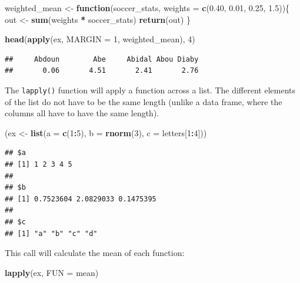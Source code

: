 \documentclass[]{book}
\makeatletter
\newenvironment{Shaded}{\begin{snugshade}}{\end{snugshade}}
\newcommand{\KeywordTok}[1]{\textcolor[rgb]{0.13,0.29,0.53}{\textbf{#1}}}
\newcommand{\DataTypeTok}[1]{\textcolor[rgb]{0.13,0.29,0.53}{#1}}
\newcommand{\DecValTok}[1]{\textcolor[rgb]{0.00,0.00,0.81}{#1}}
\newcommand{\FloatTok}[1]{\textcolor[rgb]{0.00,0.00,0.81}{#1}}
\newcommand{\StringTok}[1]{\textcolor[rgb]{0.31,0.60,0.02}{#1}}
\newcommand{\ControlFlowTok}[1]{\textcolor[rgb]{0.13,0.29,0.53}{\textbf{#1}}}
\newcommand{\OperatorTok}[1]{\textcolor[rgb]{0.81,0.36,0.00}{\textbf{#1}}}
\newcommand{\NormalTok}[1]{#1}
\newenvironment{kframe}{%
\medskip{}
\setlength{\fboxsep}{.8em}
 \def\at@end@of@kframe{}%
 \ifinner\ifhmode%
  \def\at@end@of@kframe{\end{minipage}}%
  \begin{minipage}{\columnwidth}%
 \fi\fi%
 \def\FrameCommand##1{\hskip\@totalleftmargin \hskip-\fboxsep
 \colorbox{shadecolor}{##1}\hskip-\fboxsep
     \hskip-\linewidth \hskip-\@totalleftmargin \hskip\columnwidth}%
 \MakeFramed {\advance\hsize-\width
   \@totalleftmargin\z@ \linewidth\hsize
   \@setminipage}}%
 {\par\unskip\endMakeFramed%
 \at@end@of@kframe}
\renewenvironment{Shaded}{\begin{kframe}}{\end{kframe}}
\theoremstyle{definition}
\theoremstyle{definition}
\theoremstyle{definition}
\theoremstyle{remark}
\makeatother
\begin{document}
\begin{Shaded}
\begin{Highlighting}[]
\NormalTok{weighted_mean <-}\StringTok{ }\ControlFlowTok{function}\NormalTok{(soccer_stats,}
                          \DataTypeTok{weights =} \KeywordTok{c}\NormalTok{(}\FloatTok{0.40}\NormalTok{, }\FloatTok{0.01}\NormalTok{,}
                                      \FloatTok{0.25}\NormalTok{, }\FloatTok{1.5}\NormalTok{))\{}
\NormalTok{  out <-}\StringTok{ }\KeywordTok{sum}\NormalTok{(weights }\OperatorTok{*}\StringTok{ }\NormalTok{soccer_stats)}
  \KeywordTok{return}\NormalTok{(out)}
\NormalTok{\}}

\KeywordTok{head}\NormalTok{(}\KeywordTok{apply}\NormalTok{(ex, }\DataTypeTok{MARGIN =} \DecValTok{1}\NormalTok{, weighted_mean), }\DecValTok{4}\NormalTok{)}
\end{Highlighting}
\end{Shaded}

\begin{verbatim}
##     Abdoun        Abe     Abidal Abou Diaby 
##       0.06       4.51       2.41       2.76
\end{verbatim}

The \texttt{lapply()} function will apply a function across a list. The
different elements of the list do not have to be the same length (unlike
a data frame, where the columns all have to have the same length).

\begin{Shaded}
\begin{Highlighting}[]
\NormalTok{(ex <-}\StringTok{ }\KeywordTok{list}\NormalTok{(}\DataTypeTok{a =} \KeywordTok{c}\NormalTok{(}\DecValTok{1}\OperatorTok{:}\DecValTok{5}\NormalTok{), }\DataTypeTok{b =} \KeywordTok{rnorm}\NormalTok{(}\DecValTok{3}\NormalTok{), }\DataTypeTok{c =}\NormalTok{ letters[}\DecValTok{1}\OperatorTok{:}\DecValTok{4}\NormalTok{]))}
\end{Highlighting}
\end{Shaded}

\begin{verbatim}
## $a
## [1] 1 2 3 4 5
## 
## $b
## [1] 0.7523604 2.0829033 0.1475395
## 
## $c
## [1] "a" "b" "c" "d"
\end{verbatim}

This call will calculate the mean of each function:

\begin{Shaded}
\begin{Highlighting}[]
\KeywordTok{lapply}\NormalTok{(ex, }\DataTypeTok{FUN =}\NormalTok{ mean)}
\end{Highlighting}
\end{Shaded}
\end{document}
